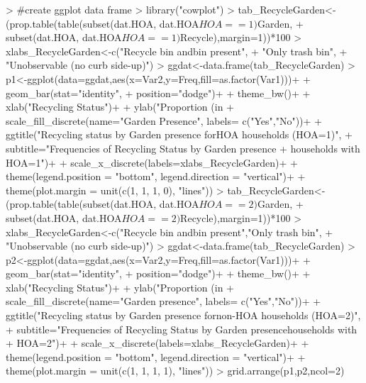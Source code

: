 \documentclass{article}
\begin{document}
\begin{Schunk}
\begin{Sinput}
> #create ggplot data frame
> library("cowplot") 
> tab_RecycleGarden<-(prop.table(table(subset(dat.HOA, dat.HOA$HOA==1)$Garden,
+                                        subset(dat.HOA, dat.HOA$HOA==1)$Recycle),margin=1))*100
> xlabs_RecycleGarden<-c("Recycle bin and\ntrash bin present",
+                        "Only trash bin\npresent", 
+                        "Unobservable (no curb side\npick-up)")
> ggdat<-data.frame(tab_RecycleGarden)
> p1<-ggplot(data=ggdat,aes(x=Var2,y=Freq,fill=as.factor(Var1)))+
+   geom_bar(stat="identity",
+            position="dodge")+
+   theme_bw()+
+   xlab("Recycling Status")+
+   ylab("Proportion (in %
+   scale_fill_discrete(name="Garden Presence", labels= c("Yes","No"))+
+   ggtitle("Recycling status by Garden presence for\nonly HOA households (HOA=1)",
+           subtitle="Frequencies of Recycling Status by Garden presence\nfor 
+           households with HOA=1")+
+   scale_x_discrete(labels=xlabs_RecycleGarden)+
+   theme(legend.position = "bottom", legend.direction = "vertical")+
+   theme(plot.margin = unit(c(1, 1, 1, 0), "lines"))
> tab_RecycleGarden<-(prop.table(table(subset(dat.HOA, dat.HOA$HOA==2)$Garden,
+                                        subset(dat.HOA, dat.HOA$HOA==2)$Recycle),margin=1))*100
> xlabs_RecycleGarden<-c("Recycle bin and\ntrash bin present","Only trash bin\npresent",
+                        "Unobservable (no curb side\npick-up)")
> ggdat<-data.frame(tab_RecycleGarden)
> p2<-ggplot(data=ggdat,aes(x=Var2,y=Freq,fill=as.factor(Var1)))+
+   geom_bar(stat="identity",
+            position="dodge")+
+   theme_bw()+
+   xlab("Recycling Status")+
+   ylab("Proportion (in %
+   scale_fill_discrete(name="Garden presence", labels= c("Yes","No"))+
+   ggtitle("Recycling status by Garden presence for\nonly non-HOA households (HOA=2)", 
+           subtitle="Frequencies of Recycling Status by Garden presence\nfor households with
+           HOA=2")+
+   scale_x_discrete(labels=xlabs_RecycleGarden)+
+   theme(legend.position = "bottom", legend.direction = "vertical")+
+   theme(plot.margin = unit(c(1, 1, 1, 1), "lines"))
> grid.arrange(p1,p2,ncol=2)
\end{Sinput}
\end{Schunk}
\end{document}
